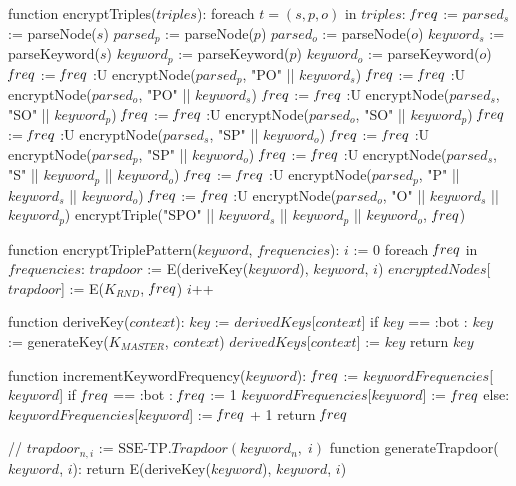 function encryptTriples($triples$):
	foreach $t = (s,p,o)$ in $triples$:
        $\textrm{\emph{f}}req$ := {}
        $parsed_s$ := parseNode($s$)
        $parsed_p$ := parseNode($p$)
        $parsed_o$ := parseNode($o$)
        $keyword_s$ := parseKeyword($s$)
        $keyword_p$ := parseKeyword($p$)
        $keyword_o$ := parseKeyword($o$)
        $\textrm{\emph{f}}req$ := $\textrm{\emph{f}}req$ :U { encryptNode($parsed_p$, "PO" || $keyword_s$) }
        $\textrm{\emph{f}}req$ := $\textrm{\emph{f}}req$ :U { encryptNode($parsed_o$, "PO" || $keyword_s$) }
        $\textrm{\emph{f}}req$ := $\textrm{\emph{f}}req$ :U { encryptNode($parsed_s$, "SO" || $keyword_p$) }
        $\textrm{\emph{f}}req$ := $\textrm{\emph{f}}req$ :U { encryptNode($parsed_o$, "SO" || $keyword_p$) }
        $\textrm{\emph{f}}req$ := $\textrm{\emph{f}}req$ :U { encryptNode($parsed_s$, "SP" || $keyword_o$) }
        $\textrm{\emph{f}}req$ := $\textrm{\emph{f}}req$ :U { encryptNode($parsed_p$, "SP" || $keyword_o$) }
        $\textrm{\emph{f}}req$ := $\textrm{\emph{f}}req$ :U { encryptNode($parsed_s$, "S" || $keyword_p$ || $keyword_o$) }
        $\textrm{\emph{f}}req$ := $\textrm{\emph{f}}req$ :U { encryptNode($parsed_p$, "P" || $keyword_s$ || $keyword_o$) }
        $\textrm{\emph{f}}req$ := $\textrm{\emph{f}}req$ :U { encryptNode($parsed_o$, "O" || $keyword_s$ || $keyword_p$) }
        encryptTriple("SPO" || $keyword_s$ || $keyword_p$ || $keyword_o$, $\textrm{\emph{f}}req$)
 
function encryptTriplePattern($keyword$, $frequencies$): 
    $i$ := 0
    foreach $\textrm{\emph{f}}req$ in $frequencies$:
        $trapdoor$ := E(deriveKey($keyword$), $keyword$, $i$)
        $encryptedNodes$[$trapdoor$] := E($K_{RND}$, $\textrm{\emph{f}}req$)
        $i$++

function deriveKey($context$):
    $key$ := $derivedKeys$[$context$]
    if $key$ == :bot :
        $key$ := generateKey($K_{MASTER}$, $context$)
        $derivedKeys$[$context$] := $key$
    return $key$

function incrementKeywordFrequency($keyword$):
    $\textrm{\emph{f}}req$ := $keywordFrequencies$[$keyword$]
    if $\textrm{\emph{f}}req$ == :bot :
        $\textrm{\emph{f}}req$ := 1
        $keywordFrequencies$[$keyword$] := $\textrm{\emph{f}}req$
    else:
        $keywordFrequencies$[$keyword$] := $\textrm{\emph{f}}req$ + 1
    return $\textrm{\emph{f}}req$

// $trapdoor_{n,i}$ := $\textrm{SSE-TP}.Trapdoor(keyword_n, \; i)$
function generateTrapdoor($keyword$, $i$):
    return E(deriveKey($keyword$), $keyword$, $i$)
    
